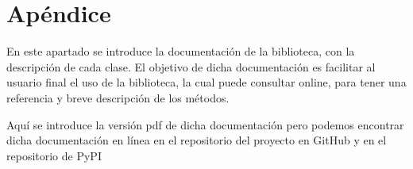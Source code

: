 \chapter{Apéndice}
En este apartado se introduce la documentación de la biblioteca,
con la descripción de cada clase. El objetivo de dicha documentación es 
facilitar al usuario final el uso de la biblioteca, la cual puede 
consultar online, para tener una referencia y breve
descripción de los métodos.

Aquí se introduce la versión pdf de dicha documentación pero
podemos encontrar dicha documentación en línea en el repositorio
del proyecto en GitHub \cite{Miki97TFGOutlierDetectionHttps} y en el repositorio de 
PyPI \cite{PyDBODDistancesBased}





%